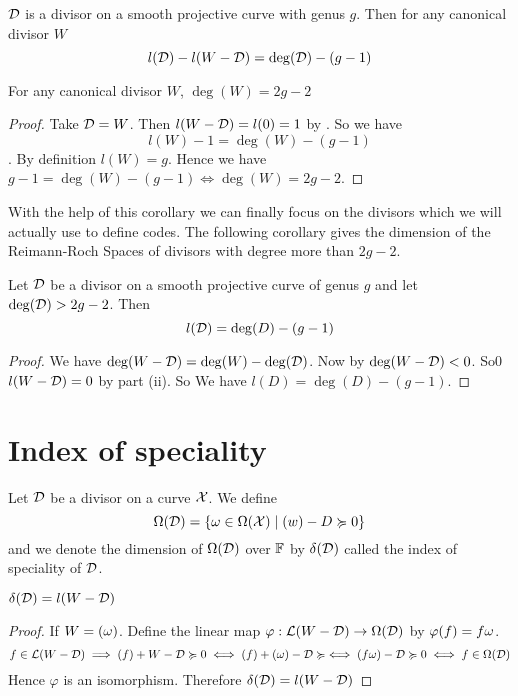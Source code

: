 \begin{theorem}
	$\mathcal{D}$ is a divisor on a smooth projective curve with genus $g$. Then for any canonical divisor $W$ $$l(\mathcal{D}) - l(W-\mathcal{D})= \deg(\mathcal{D})- (g-1)$$
\end{theorem}
\begin{corollary}\label{candivdeg}
	For any canonical divisor $W$,  $\deg(W)=2g-2$
\end{corollary}
\begin{proof}
	Take $\mathcal{D}=W$. Then $l(W-\mathcal{D})=l(0)=1$ by . So we have $$l(W)-1=\deg(W)-(g-1)$$. By definition $l(W)=g$. Hence we have $g-1=\deg(W)-(g-1)\iff \deg(W)=2g-2$.
\end{proof}
With the help of this corollary we can finally focus on the divisors which we will actually use to define codes. The following corollary gives the dimension of the Reimann-Roch Spaces of divisors with degree more than $2g-2$.
\begin{corollary}
	Let $\mathcal{D}$ be a divisor on a smooth projective curve of genus $g$ and let $\deg(\mathcal{D})>2g-2$. Then $$l(\mathcal{D})=\deg(D)-(g-1)$$
\end{corollary}
\begin{proof}
	We have $\deg(W-\mathcal{D})=\deg(W)-\deg(\mathcal{D})$. Now by  $\deg(W-\mathcal{D})<0$. So0 $l(W-\mathcal{D})=0$ by  part (ii). So We have $l(D)=\deg(D)-(g-1)$.
\end{proof}
\section{Index of speciality}
\begin{definition}
	Let $\mathcal{D}$ be a divisor on a curve $\mathcal{X}$. We define $$\Omega(\mathcal{D})=\{\omega\in \Omega(\mathcal{X})\mid (w)-D\succcurlyeq 0\}$$ and we denote the dimension of $\Omega(\mathcal{D})$ over $\mathbb{F}$ by $\delta(\mathcal{D})$ called the index of speciality of $\mathcal{D}$.
\end{definition}
\begin{theorem}
	$\delta(\mathcal{D})=l(W-\mathcal{D})$
\end{theorem}
\begin{proof}
	If $W=(\omega)$. Define the linear map $\varphi:\mathcal{L}(W-\mathcal{D})\to \Omega(\mathcal{D})$ by $\varphi(f)=f\omega$. $$f\in \mathcal{L}(W-\mathcal{D})\implies (f)+W-\mathcal{D}\succcurlyeq 0 \iff (f)+(\omega)-\mathcal{D}\succcurlyeq \iff (f\omega)-\mathcal{D}\succcurlyeq0\iff f\in \Omega(\mathcal{D})$$Hence $\varphi$ is an isomorphism. Therefore $\delta(\mathcal{D})=l(W-\mathcal{D})$
\end{proof}
